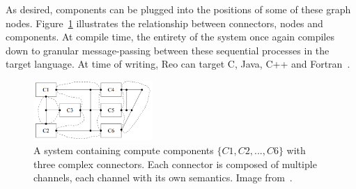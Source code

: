 As desired, components can be plugged into the positions of some of these graph nodes. Figure~\ref{fig:reoConnector} illustrates the relationship between connectors, nodes and components. At compile time, the entirety of the system once again compiles down to granular message-passing between these sequential processes in the target language. At time of writing, Reo can target C, Java, C++ and Fortran~\cite{reoLinda, global}.
\begin{figure}
\centering
\includegraphics[page=1, width=0.4\textwidth]{images/reoConnector.png}
\caption[]{A system containing compute components $\{C1, C2, ... , C6\}$ with three complex connectors. Each connector is composed of multiple channels, each channel with its own semantics. Image  from~\cite{introReo}.}
\label{fig:reoConnector}
\end{figure}